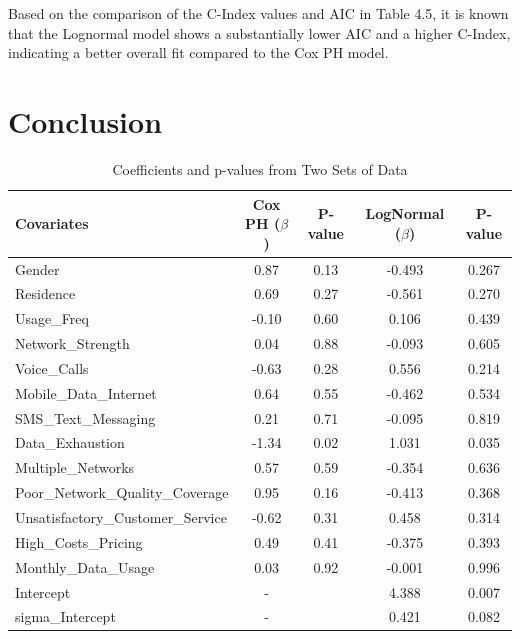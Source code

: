 \documentclass[doublespacing]{report} %
\begin{document}
Based on the comparison of the C-Index values and AIC in Table 4.5, it is known that the Lognormal model shows a substantially lower AIC  and a higher C-Index, indicating a better overall fit compared to the Cox PH model. 

\newpage
\chapter{Conclusion}


\begin{table}[ht]
\centering
\caption{Coefficients and p-values from Two Sets of Data}
\begin{tabular}{lcccc}
\hline
Covariates& Cox PH ($\beta$)& P-value & LogNormal ($\beta$)& P-value\\
\hline
Gender & 0.87 & 0.13 & -0.493 & 0.267 \\
Residence & 0.69 & 0.27 & -0.561 & 0.270 \\
Usage\_Freq & -0.10 & 0.60 & 0.106 & 0.439 \\
Network\_Strength & 0.04 & 0.88 & -0.093 & 0.605 \\
Voice\_Calls & -0.63 & 0.28 & 0.556 & 0.214 \\
Mobile\_Data\_Internet & 0.64 & 0.55 & -0.462 & 0.534 \\
SMS\_Text\_Messaging & 0.21 & 0.71 & -0.095 & 0.819 \\
Data\_Exhaustion & -1.34 & 0.02 & 1.031 & 0.035 \\
Multiple\_Networks & 0.57 & 0.59 & -0.354 & 0.636 \\
Poor\_Network\_Quality\_Coverage & 0.95 & 0.16 & -0.413 & 0.368 \\
Unsatisfactory\_Customer\_Service & -0.62 & 0.31 & 0.458 & 0.314 \\
High\_Costs\_Pricing & 0.49 & 0.41 & -0.375 & 0.393 \\
Monthly\_Data\_Usage & 0.03 & 0.92 & -0.001 & 0.996 \\
Intercept & -& & 4.388 & 0.007 \\
sigma\_Intercept & -& & 0.421 & 0.082 \\
\hline
\end{tabular}
\label{tab:combined_coefficients}
\end{table}
\end{document}
